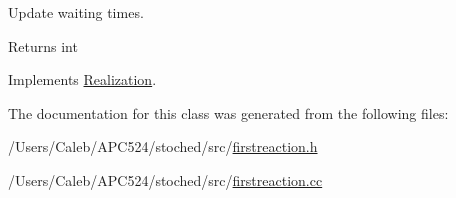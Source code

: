 Update waiting times. 

\begin{DoxyReturn}{Returns}
int 
\end{DoxyReturn}


Implements \hyperlink{class_realization}{Realization}.



The documentation for this class was generated from the following files\+:\begin{DoxyCompactItemize}
\item 
/\+Users/\+Caleb/\+A\+P\+C524/stoched/src/\hyperlink{firstreaction_8h}{firstreaction.\+h}\item 
/\+Users/\+Caleb/\+A\+P\+C524/stoched/src/\hyperlink{firstreaction_8cc}{firstreaction.\+cc}\end{DoxyCompactItemize}
